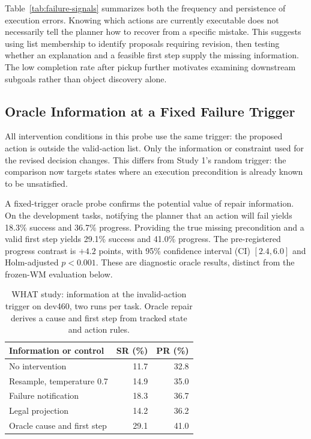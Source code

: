 \documentclass[runningheads]{llncs}
\begin{document}
Table~\ref{tab:failure-signals} summarizes both the frequency and persistence of execution errors. Knowing which actions are currently executable does not necessarily tell the planner how to recover from a specific mistake. This suggests using list membership to identify proposals requiring revision, then testing whether an explanation and a feasible first step supply the missing information. The low completion rate after pickup further motivates examining downstream subgoals rather than object discovery alone.

\subsection{Oracle Information at a Fixed Failure Trigger}
All intervention conditions in this probe use the same trigger: the proposed action is outside the valid-action list. Only the information or constraint used for the revised decision changes. This differs from Study 1's random trigger: the comparison now targets states where an execution precondition is already known to be unsatisfied.

A fixed-trigger oracle probe confirms the potential value of repair information. On the development tasks, notifying the planner that an action will fail yields 18.3\% success and 36.7\% progress. Providing the true missing precondition and a valid first step yields 29.1\% success and 41.0\% progress. The pre-registered progress contrast is $+4.2$ points, with 95\% confidence interval (CI) $[2.4,6.0]$ and Holm-adjusted $p<0.001$. These are diagnostic oracle results, distinct from the frozen-WM evaluation below.

\begin{table}[tbp]
\caption{WHAT study: information at the invalid-action trigger on dev460, two runs per task. Oracle repair derives a cause and first step from tracked state and action rules.}
\label{tab:what-oracle}\centering
\begin{tabular}{lrr}\toprule
Information or control & SR (\%) & PR (\%)\\\midrule
No intervention & 11.7 & 32.8\\
Resample, temperature 0.7 & 14.9 & 35.0\\
Failure notification & 18.3 & 36.7\\
Legal projection & 14.2 & 36.2\\
Oracle cause and first step & 29.1 & 41.0\\\bottomrule
\end{tabular}
\end{table}
\end{document}
